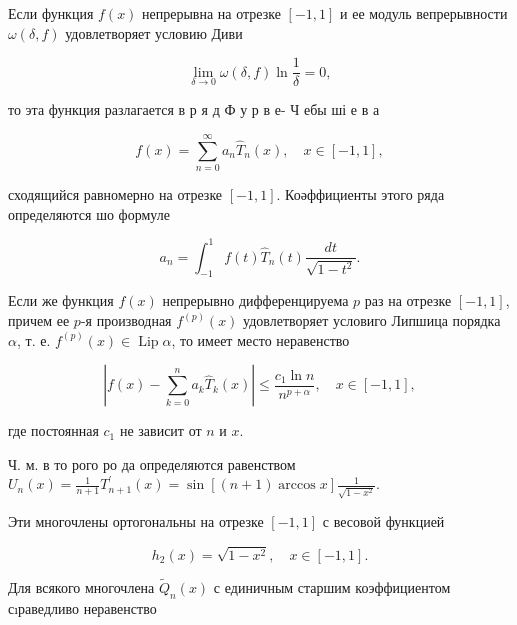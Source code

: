 \documentclass[10pt]{article}
\begin{document}
Если функция $f(x)$ непрерывна на отрезке $[-1,1]$ и ее модуль вепрерывности $\omega(\delta, f)$ удовлетворяет условию Диви



\[

\lim _{\delta \rightarrow 0} \omega(\delta, f) \ln \frac{1}{\delta}=0,

\]



то эта функция разлагается в р я д Ф у р в е- Ч ебы ші е в а



\[

f(x)=\sum_{n=0}^{\infty} a_{n} \hat{T}_{n}(x), \quad x \in[-1,1],

\]



сходящийся равномерно на отрезке $[-1,1]$. Коәффициенты этого ряда определяются шо формуле



\[

a_{n}=\int_{-1}^{1} f(t) \widehat{T}_{n}(t) \frac{d t}{\sqrt{1-t^{2}}} .

\]



Если же функция $f(x)$ непрерывно дифференцируема $p$ раз на отрезке $[-1,1]$, причем ее $p$-я производная $f^{(p)}(x)$ удовлетворяет условиго Липшица порядка $\alpha$, т. е. $f^{(p)}(x) \in \operatorname{Lip} \alpha$, то имеет место неравенство



\[

\left|f(x)-\sum_{k=0}^{n} a_{k} \hat{T}_{k}(x)\right| \leqslant \frac{c_{1} \ln n}{n^{p+\alpha}}, \quad x \in[-1,1],

\]



где постоянная $c_{1}$ не зависит от $n$ и $x$.



Ч. м. в то рого ро да определяются равенством $U_{n}(x)=\frac{1}{n+1} T_{n+1}^{\prime}(x)=\sin [(n+1) \arccos x] \frac{1}{\sqrt{1-x^{2}}}$.



Эти многочлены ортогональны на отрезке $[-1,1]$ с весовой функцией



\[

h_{2}(x)=\sqrt{1-x^{2}}, \quad x \in[-1,1] .

\]



Для всякого многочлена $\tilde{Q}_{n}(x)$ с единичным старшим коэффициентом сıраведливо неравенство
\end{document}
